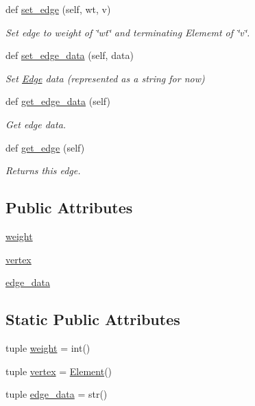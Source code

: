 \begin{DoxyCompactItemize}
def \hyperlink{class_edge_1_1_edge_aeb4f9f2847ff4b3700d93f9fb706832d}{set\+\_\+edge} (self, wt, v)
\begin{DoxyCompactList}\small\item\em Set edge to weight of \char`\"{}wt\char`\"{} and terminating Elememt of \char`\"{}v\char`\"{}. \end{DoxyCompactList}\item 
def \hyperlink{class_edge_1_1_edge_a084efa7d8d445120d670a3885098ae5b}{set\+\_\+edge\+\_\+data} (self, data)
\begin{DoxyCompactList}\small\item\em Set \hyperlink{class_edge_1_1_edge}{Edge} data (represented as a string for now) \end{DoxyCompactList}\item 
def \hyperlink{class_edge_1_1_edge_ad8870d0b9ff7cb447b888bd17dc77cb3}{get\+\_\+edge\+\_\+data} (self)
\begin{DoxyCompactList}\small\item\em Get edge data. \end{DoxyCompactList}\item 
def \hyperlink{class_edge_1_1_edge_ab99b18da5bafa083123f36ca4004925f}{get\+\_\+edge} (self)
\begin{DoxyCompactList}\small\item\em Returns this edge. \end{DoxyCompactList}\end{DoxyCompactItemize}
\subsection*{Public Attributes}
\begin{DoxyCompactItemize}
\item 
\hyperlink{class_edge_1_1_edge_a0f1b80578fe4bafb45c269111bf9822c}{weight}
\item 
\hyperlink{class_edge_1_1_edge_a024c98580ed6649429e1996725333c7b}{vertex}
\item 
\hyperlink{class_edge_1_1_edge_a7c92348b4e8e4f5027bc2fd230e353e7}{edge\+\_\+data}
\end{DoxyCompactItemize}
\subsection*{Static Public Attributes}
\begin{DoxyCompactItemize}
\item 
tuple \hyperlink{class_edge_1_1_edge_aa7dd465d78ed2c2531e23074004d2ef5}{weight} = int()
\item 
tuple \hyperlink{class_edge_1_1_edge_a48bfb886a5de7853567bac72145f61a2}{vertex} = \hyperlink{class_element_1_1_element}{Element}()
\item 
tuple \hyperlink{class_edge_1_1_edge_a97ac8ede06a4e30d3cf5d3db603b73f8}{edge\+\_\+data} = str()
\end{DoxyCompactItemize}


